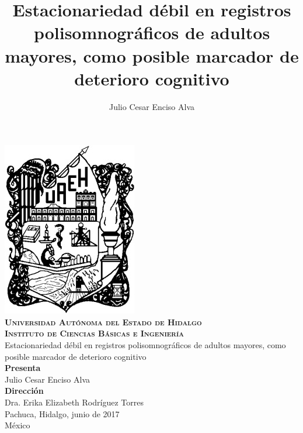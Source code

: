 \documentclass[12pt,a4paper]{mitthesis}
\begin{document}
\setcounter{page}{0}
\thispagestyle{empty}

\title{Estacionariedad d\'ebil en registros polisomnogr\'aficos de adultos mayores,
como posible marcador de deterioro cognitivo}
\author{Julio Cesar Enciso Alva}

{

\begin{center}
\includegraphics[width=0.2\linewidth]{./portada/logo_uaeh.png}\\
{\Large \textbf{ \textsc{
Universidad Aut\'onoma del Estado de Hidalgo\\
Instituto de Ciencias B\'asicas e Ingenier\'ia\\
}}
\vspace*{3.5em}
}
{\huge
Estacionariedad d\'ebil en registros polisomnogr\'aficos de adultos mayores,
como posible marcador de deterioro cognitivo\\
\vspace*{2.5em}
}
{\large
\textbf{Presenta}\\
\vspace*{.25em}}
{\Large
Julio Cesar Enciso Alva\\
\vspace*{4em}
}
{\large
\textbf{Direcci\'on}\\
\vspace*{.25em}}
{\Large
Dra. Erika Elizabeth Rodr\'iguez Torres\\
\vspace*{4em}
}
{\large
Pachuca, Hidalgo, junio de 2017\\
M\'exico
}

\end{center}
}

\newpage

\end{document}
